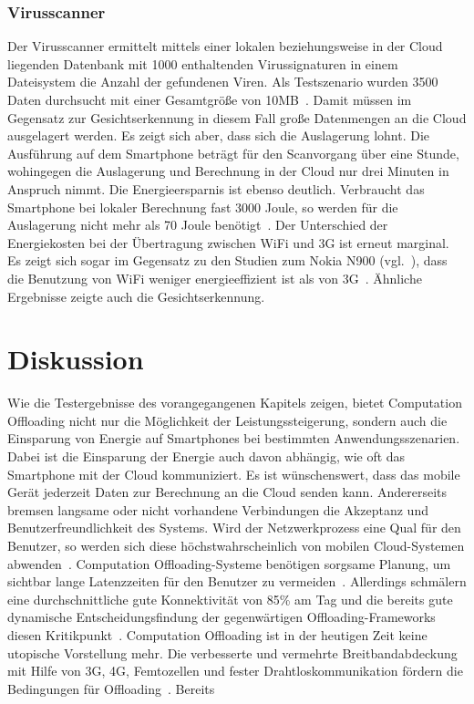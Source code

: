 \documentclass{sigchi}
\begin{document}
\subsubsection{Virusscanner}
Der Virusscanner ermittelt mittels einer lokalen beziehungsweise in der Cloud liegenden Datenbank mit 1000 enthaltenden Virussignaturen in einem Dateisystem die Anzahl der gefundenen Viren.
Als Testszenario wurden 3500 Daten durchsucht mit einer Gesamtgröße von 10MB~\cite{thinkair}.
Damit müssen im Gegensatz zur Gesichtserkennung in diesem Fall große Datenmengen an die Cloud ausgelagert werden.
Es zeigt sich aber, dass sich die Auslagerung lohnt.
Die Ausführung auf dem Smartphone beträgt für den Scanvorgang über eine Stunde, wohingegen  die Auslagerung und Berechnung in der Cloud nur drei Minuten in Anspruch nimmt.
Die Energieersparnis ist ebenso deutlich.
Verbraucht das Smartphone bei lokaler Berechnung fast 3000 Joule, so werden für die Auslagerung nicht mehr als 70 Joule benötigt~\cite{thinkair}.
Der Unterschied der Energiekosten bei der Übertragung zwischen WiFi und 3G ist erneut marginal.
Es zeigt sich sogar im Gegensatz zu den Studien zum Nokia N900 (vgl.~\cite{o8, o12}), dass die Benutzung von WiFi weniger energieeffizient ist als von 3G~\cite{thinkair}.
Ähnliche Ergebnisse zeigte auch die Gesichtserkennung.

\section{Diskussion}

Wie die Testergebnisse des vorangegangenen Kapitels zeigen, bietet Computation Offloading nicht nur die Möglichkeit der Leistungssteigerung, sondern auch die Einsparung von Energie auf Smartphones bei bestimmten Anwendungsszenarien.
Dabei ist die Einsparung der Energie auch davon abhängig, wie oft das Smartphone mit der Cloud kommuniziert.
Es ist wünschenswert, dass das mobile Gerät jederzeit Daten zur Berechnung an die Cloud senden kann.
Andererseits bremsen langsame oder nicht vorhandene Verbindungen die Akzeptanz und Benutzerfreundlichkeit des Systems.
Wird der Netzwerkprozess eine Qual für den Benutzer, so werden sich diese höchstwahrscheinlich von mobilen Cloud-Systemen abwenden~\cite{o2}.
Computation Offloading-Systeme benötigen sorgsame Planung, um sichtbar lange Latenzzeiten für den Benutzer zu vermeiden~\cite{o12}.
Allerdings schmälern eine durchschnittliche gute Konnektivität von 85\% am Tag und die bereits gute dynamische Entscheidungsfindung der gegenwärtigen Offloading-Frameworks diesen Kritikpunkt~\cite{o2}.
Computation Offloading ist in der heutigen Zeit keine utopische Vorstellung mehr.
Die verbesserte und vermehrte Breitbandabdeckung mit Hilfe von 3G, 4G, Femtozellen und fester Drahtloskommunikation fördern die Bedingungen für Offloading~\cite{thoughtsoncloud}.
Bereits 
\end{document}
